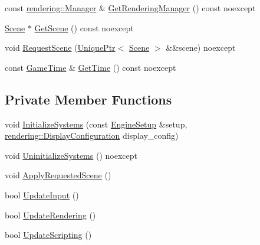 \begin{DoxyCompactItemize}
\item 
const \mbox{\hyperlink{classmage_1_1rendering_1_1_manager}{rendering\+::\+Manager}} \& \mbox{\hyperlink{classmage_1_1_engine_a9386c3aff5d7580ea39202e4dae967de}{Get\+Rendering\+Manager}} () const noexcept
\item 
\mbox{\hyperlink{classmage_1_1_scene}{Scene}} $\ast$ \mbox{\hyperlink{classmage_1_1_engine_ac76b2061f2b5b9089a6b2387a40dbf73}{Get\+Scene}} () const noexcept
\item 
void \mbox{\hyperlink{classmage_1_1_engine_a0999f6eb6b09ad015103a46509b333b8}{Request\+Scene}} (\mbox{\hyperlink{namespacemage_a3316d7143a973e37adf1110f2e80ca31}{Unique\+Ptr}}$<$ \mbox{\hyperlink{classmage_1_1_scene}{Scene}} $>$ \&\&scene) noexcept
\item 
const \mbox{\hyperlink{classmage_1_1_game_time}{Game\+Time}} \& \mbox{\hyperlink{classmage_1_1_engine_a77d6f8ed151e50360da8f6afcce463ea}{Get\+Time}} () const noexcept
\end{DoxyCompactItemize}
\subsection*{Private Member Functions}
\begin{DoxyCompactItemize}
\item 
void \mbox{\hyperlink{classmage_1_1_engine_aec74e74ebec5c7739740bbeb825526ad}{Initialize\+Systems}} (const \mbox{\hyperlink{classmage_1_1_engine_setup}{Engine\+Setup}} \&setup, \mbox{\hyperlink{classmage_1_1rendering_1_1_display_configuration}{rendering\+::\+Display\+Configuration}} display\+\_\+config)
\item 
void \mbox{\hyperlink{classmage_1_1_engine_ac0632bce91156f13d4bc76f5b25fc94b}{Uninitialize\+Systems}} () noexcept
\item 
void \mbox{\hyperlink{classmage_1_1_engine_a4fcb9760814dfa59c9fff34f1c82357b}{Apply\+Requested\+Scene}} ()
\item 
bool \mbox{\hyperlink{classmage_1_1_engine_ad35eef077bc695803769a385e2751cbe}{Update\+Input}} ()
\item 
bool \mbox{\hyperlink{classmage_1_1_engine_a5a39d76019d51290a5ba305c57384fae}{Update\+Rendering}} ()
\item 
bool \mbox{\hyperlink{classmage_1_1_engine_a3c7a55a89a23952a368432f933a90d26}{Update\+Scripting}} ()
\end{DoxyCompactItemize}
